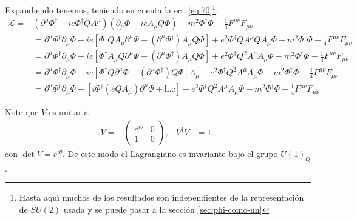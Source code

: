 Expandiendo tenemos, teniendo en cuenta la ec.~\eqref{eq:70}\footnote{Hasta aqu\'\i{} muchos de los resultados son independientes de la representaci\'on de $SU(2)$ usada y se puede pasar a la secci\'on \ref{sec:phi-como-un}}, 
\begin{align}
  \label{eq:192}
  \mathcal{L}=&\left(\partial^\mu\Phi^\dagger+ie\Phi^\dagger Q{A^\mu}\right)\left(\partial_\mu\Phi-ieA_\mu Q\Phi\right)
  -m^2\Phi^\dagger \Phi-\tfrac{1}{4}F^{\mu\nu}F_{\mu\nu}\nonumber\\
&=\partial^\mu\Phi^\dagger\partial_\mu\Phi+ie\left[\Phi^\dagger Q{A_\mu}\partial^\mu\Phi-\left(\partial^\mu\Phi^\dagger\right) A_\mu Q\Phi\right]+e^2\Phi^\dagger Q{A^\mu}Q A_\mu\Phi
-m^2\Phi^\dagger \Phi-\tfrac{1}{4}F^{\mu\nu}F_{\mu\nu}\nonumber\\
&=\partial^\mu\Phi^\dagger\partial_\mu\Phi+ie\left[\Phi^\dagger A_\mu Q\partial^\mu\Phi-\left(\partial^\mu\Phi^\dagger\right)A_\mu Q\Phi\right]+e^2\Phi^\dagger Q^2 A^\mu A_\mu\Phi
-m^2\Phi^\dagger \Phi-\tfrac{1}{4}F^{\mu\nu}F_{\mu\nu}\nonumber\\
&=\partial^\mu\Phi^\dagger\partial_\mu\Phi+ie\left[\Phi^\dagger Q\partial^\mu\Phi-\left(\partial^\mu\Phi^\dagger\right)Q\Phi\right]A_\mu+e^2\Phi^\dagger Q^2 A^\mu A_\mu\Phi
-m^2\Phi^\dagger \Phi-\tfrac{1}{4}F^{\mu\nu}F_{\mu\nu}\nonumber\\
&=\partial^\mu\Phi^\dagger\partial_\mu\Phi+\left[i\Phi^\dagger(eQA_\mu)\partial^\mu\Phi+\text{h.c}\right]+e^2\Phi^\dagger Q^2 A^\mu A_\mu\Phi
-m^2\Phi^\dagger \Phi-\tfrac{1}{4}F^{\mu\nu}F_{\mu\nu}
\end{align}

Note que $V$ es unitaria
\begin{align}
  V=&
  \begin{pmatrix}
    e^{i\theta}&0\\
    1&0
  \end{pmatrix},& V^\dagger V&=1\,.
\end{align}
con $\det V=e^{i \theta}$. De este modo el Lagrangiano es invariante bajo el grupo $U(1)_Q$.

